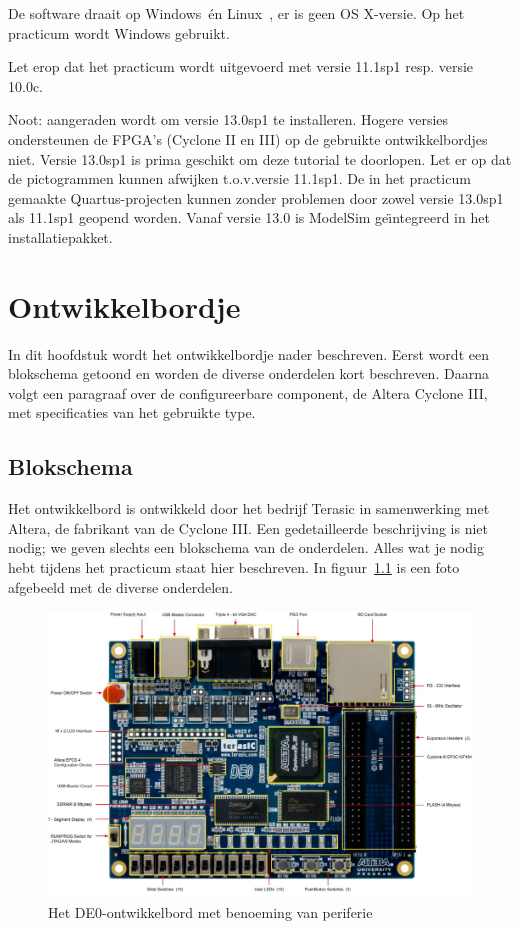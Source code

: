 \documentclass[a4paper,12pt,fleqn,twoside]{book}
\begin{document}
De software draait op Windows\texttrademark\ \'{e}n Linux\texttrademark\ , er
is geen OS X-versie. Op het practicum wordt Windows gebruikt.

Let erop dat het practicum wordt uitgevoerd met versie 11.1sp1 resp\@. versie
10.0c.

Noot: aangeraden wordt om versie 13.0sp1 te installeren. Hogere versies
ondersteunen de FPGA's (Cyclone II en III) op de gebruikte ontwikkelbordjes
niet. Versie 13.0sp1 is prima geschikt om deze tutorial te doorlopen. Let er
op dat de pictogrammen kunnen afwijken t.o.v.\@ versie 11.1sp1. De in
het practicum gemaakte Quartus-projecten
kunnen zonder problemen door zowel versie 13.0sp1 als 11.1sp1 geopend worden.
Vanaf versie 13.0 is ModelSim ge\"{\i}ntegreerd in het installatiepakket.




\chapter{Ontwikkelbordje}
\label{chap:ontwikkelbordje}
In dit hoofdstuk wordt het ontwikkelbordje nader beschreven. Eerst wordt een
blokschema getoond en worden de diverse onderdelen kort beschreven. Daarna
volgt een paragraaf over de configureerbare component, de Altera Cyclone III,
met specificaties van het gebruikte type.


\section{Blokschema}
\label{sec:blokschema}
Het ontwikkelbord is ontwikkeld door het bedrijf Terasic in samenwerking met
Altera, de fabrikant van de Cyclone III. Een gedetailleerde beschrijving is
niet nodig; we geven slechts een blokschema van de onderdelen. Alles wat je
nodig hebt tijdens het practicum staat hier beschreven. In
figuur~\ref{fig:DE0-layout-yellow-1000} is een foto afgebeeld met de diverse
onderdelen.

\begin{figure}[H]
\centering
\includegraphics[scale=0.92]{DE0_layout_yellow_1000.jpg}
\caption{Het DE0-ontwikkelbord met benoeming van periferie}
\label{fig:DE0-layout-yellow-1000}
\end{figure}
\end{document}
